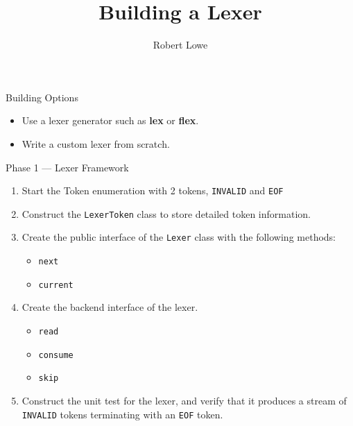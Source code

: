 \documentclass[handout]{beamer}
\title{Building a Lexer}
\author{Robert Lowe}
\institute[Southeast Missouri State University] %
{
  Department of Computer Science\\
  Southeast Missouri State University
}
\date[]{}
\begin{document}
\begin{frame}
  \titlepage
\end{frame}




\begin{frame}{Building Options}
   \begin{itemize}
       \item Use a lexer generator such as {\bf lex} or {\bf flex}.
       \item Write a custom lexer from scratch.
   \end{itemize} 
\end{frame}


\begin{frame}{Phase 1 --- Lexer Framework}
    \begin{enumerate}
        \item Start the Token enumeration with 2 tokens, \texttt{INVALID} and \texttt{EOF}
        \item Construct the \texttt{LexerToken} class to store detailed token information.
        \item Create the public interface of the \texttt{Lexer} class with the following methods:
        \begin{itemize}
            \item \texttt{next}
            \item \texttt{current}
        \end{itemize}
        \item Create the backend interface of the lexer.
        \begin{itemize}
            \item \texttt{read}
            \item \texttt{consume}
            \item \texttt{skip}
        \end{itemize}
        \item Construct the unit test for the lexer, and verify that it produces a stream of \texttt{INVALID} tokens terminating with an \texttt{EOF} token.
    \end{enumerate}
\end{frame}
\end{document}
